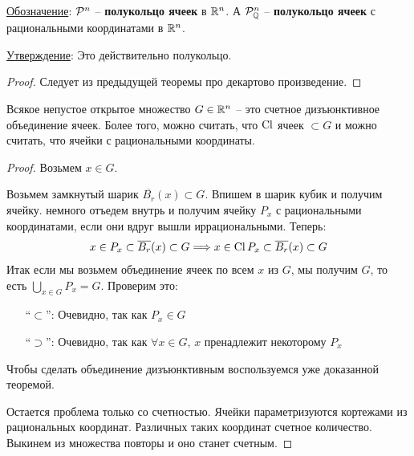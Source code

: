 \underline{Обозначение}: $\mathcal{P}^n$ -- \textbf{полукольцо ячеек} в $\mathbb{R}^n$. А $\mathcal{P}^n_{\mathbb{Q}}$ -- \textbf{полукольцо ячеек} с рациональными координатами в $\mathbb{R}^n$. 

\underline{Утверждение}: Это действительно полукольцо.

\begin{proof}
  Следует из предыдущей теоремы про декартово произведение.
\end{proof}

\begin{theorem}
  Всякое непустое открытое множество $G \in \mathbb{R}^n$ -- это счетное дизъюнктивное 
  объединение ячеек. Более того, можно считать, что $\operatorname{Cl}$ ячеек $\subset G$ и можно считать, что ячейки с рациональными координаты.
\end{theorem}

\begin{proof}
  Возьмем $x \in G$. 

  \begin{center}
  \end{center}
  Возьмем замкнутый шарик $\overline{B_r}(x) \subset G$. Впишем в шарик кубик и получим ячейку. немного отъедем внутрь и получим ячейку 
  $P_x$ с рациональными координатами, если они вдруг вышли иррациональными. Теперь:
  \begin{gather*}
    x \in P_x \subset \overline{B_r}(x) \subset G \Longrightarrow x \in \operatorname{Cl} P_x \subset \overline{B_r}(x) \subset G
  \end{gather*} 
  Итак если мы возьмем объединение ячеек по всем $x$ из $G$, мы получим $G$, то есть $\bigcup\limits_{x \in G} P_x = G$. Проверим это:
  \begin{itemize}
    \item[``$\subset$'':] Очевидно, так как $P_x \in G$
    \item[``$\supset$'':] Очевидно, так как $\forall x \in G$, $x$ пренадлежит некоторому $P_x$
  \end{itemize}
  Чтобы сделать объединение дизъюнктивным воспользуемся уже доказанной теоремой. 

  Остается проблема только со счетностью. Ячейки параметризуются кортежами из рациональных координат. Различных таких
  координат счетное количество. Выкинем из множества повторы и оно станет счетным.
\end{proof}

